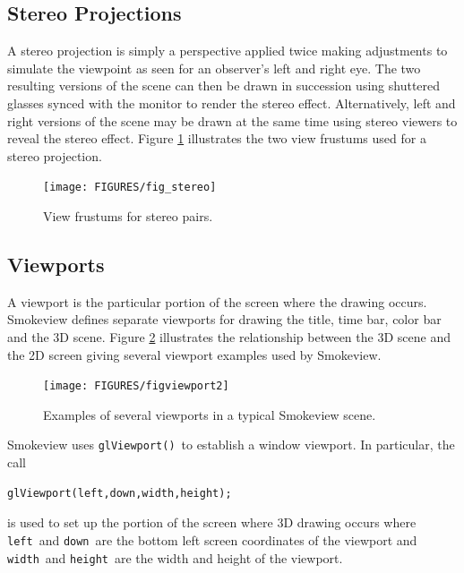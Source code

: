 \documentclass[11pt,twoside]{book}
\begin{document}
\subsection{Stereo Projections}

A stereo projection is simply a perspective applied twice making adjustments
to simulate the viewpoint as seen for an observer's left and right eye.
The two resulting versions of the scene can then be drawn in succession
using shuttered glasses synced with the monitor to render the stereo effect.
Alternatively, left and right versions of the scene may be drawn at the same
time using stereo viewers to reveal the stereo effect.  Figure \ref{figstereo}
illustrates the two view frustums used for a stereo projection.

\begin{figure}[\figoptions]
\begin{center}
\texttt{[image: FIGURES/fig\_stereo]}
\end{center}
\caption{View frustums for stereo pairs.}
 \label{figstereo}
\end{figure}

\subsection{Viewports}
A viewport is the particular portion of the screen where the
drawing occurs.  Smokeview defines separate viewports for drawing
the title, time bar, color bar and the 3D scene.  Figure
\ref{figviewports} illustrates the relationship between the 3D
scene and the 2D screen giving several viewport examples used by
Smokeview.
\begin{figure}[\figoptions]
\begin{center}
\texttt{[image: FIGURES/figviewport2]}
\end{center}
\caption{Examples of several viewports in a typical Smokeview scene.}
 \label{figviewports}
\end{figure}

Smokeview uses {\tt glViewport()}\ to establish a window viewport.  In particular, the call
\begin{lstlisting}
glViewport(left,down,width,height);
\end{lstlisting}
is used to set up the portion of the screen where 3D drawing occurs where {\tt left}\
and {\tt down}\ are the bottom left screen coordinates of the viewport and {\tt width}\
and {\tt height}\ are the width and height of the viewport.

%
%
\end{document}
